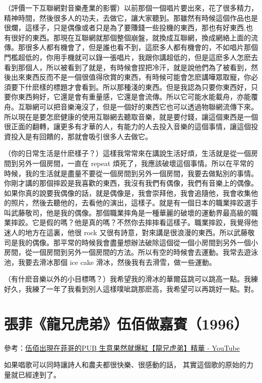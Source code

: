 \documentclass[UTF8,a4paper,oneside,twocolumn,12pt]{ctexbook}
\begin{document}
（評價一下互聯網對音樂產業的影響）以前那個一個唱片要出來，花了很多精力，精神時間，然後很多人的功夫，去做它，讓大家聽到。那雖然有時候這個作品也是很爛，這樣子，只是偶像或者只是為了要賺錢一些投機的東西，那也有好東西,也有很好的東西。那現在互聯網就那個整個崩盤，就換成互聯網，換成網絡上面的流傳。那很多人都有機會了，但是誰也看不到，這麽多人都有機會的，不如唱片那個門檻超低的，你用手機就可以錄一張唱片，我跟你講超低的，但是這麽多人怎麽去看到那個人，所以被看到了就是，有時候會捏把冷汗，就是說他們為了被看到，然後出來東西反而不是一個很值得欣賞的東西，有時候可能會怎麽講嘩眾取寵，你必須要下什麽樣的標題才會看到。所以那種淺的東西。但是我認為只要你東西好，只要你東西夠好，它還是會有重量感，它還是會流傳。所以它可能水能載舟，亦能覆舟。互聯網可以把音樂淹沒了，但是一個好的東西它也可以透過物聯網流傳下來。所以現在是要怎麽健康的使用互聯網去聽取音樂，就是要付錢，讓這個東西是一個很正面的翻轉，讓更多有才華的人，有能力的人去投入音樂的這個事情，讓這個投資投入是有回饋的，那就會吸引很多人去做它。

（你的日常生活是什麽樣子？）這樣我常常來在講說生活好煩，生活就是從一個房間到另外一個房間，一直在 repeat 煩死了，我應該破壞這個事情。所以在平常的時候，我的生活就是盡量不要從一個房間到另外一個房間，我要去做點別的事情。你剛才講的那個摔跤是我喜歡的東西，我沒有我們有偶像，我們有音樂上的偶像。如果你真的說要我偶像的話，就是偶像是，我會崇拜他，我會追隨他，我會收集他的照片，然後去聽他的，去看他的演出，這樣子。就是有一個日本的職業摔跤選手叫武藤敬司，他是我的偶像。那個職業摔角是一種華麗的破壞的運動界最高級的職業摔跤。它是假的嗎？他是真的嗎？不然你去摔摔看這樣子。職業摔跤，我覺得他迷人的地方在這裏，他很 rock 又很有詩意，對來講是很浪漫的東西。所以武藤敬司是我的偶像。那平常的時候我會盡量想辦法破除這個從一個小房間到另外一個小房間，從一個房間到另外一個房間的方法。所以有空的時候會去運動。我常去遊泳池，我要去滑冰那個 ice cake 滑冰，然後我有去滑雪，做一些運動。

（有什麽音樂以外的小目標嗎？）我希望我的滑冰的華爾茲跳可以跳高一點。我練好久，我練了一年了我看到別人這樣噗呲跳那麽高，我希望可以再跳好一點。對。

\section{張菲《龍兄虎弟》伍佰做嘉賓（1996）}
參考：\href{https://www.youtube.com/watch?v=i_j0UOQOj1Q}{伍佰出現在菲哥的PUB 生意果然就爆紅【龍兄虎弟】精華 - YouTube}

如果唱歌可以同時讓詩人和農夫都很快樂、很感動的話， 其實這個歌的原始的力量就已經達到了。

\backmatter
\end{document}
